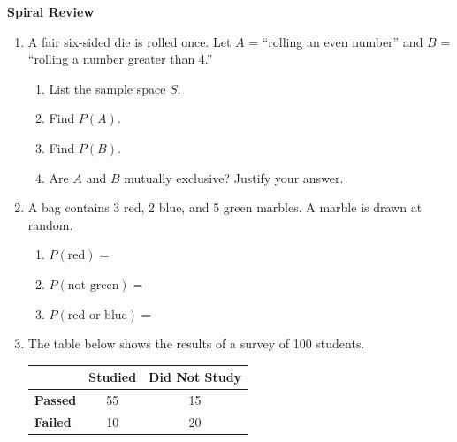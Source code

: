 \documentclass[10pt]{article}
\begin{document}
\namedateperiod

\vspace{0.2in}

{\large\bfseries\color{navy} Spiral Review}

\vspace{0.12in}

\begin{enumerate}

    \item A fair six-sided die is rolled once. Let $A$ = ``rolling an even number'' and
          $B$ = ``rolling a number greater than 4.''

    \begin{enumerate}[label=(\alph*), itemsep=8pt]
        \item List the sample space $S$. \quad {}
        \item Find $P(A)$. \quad {}
        \item Find $P(B)$. \quad {}
        \item Are $A$ and $B$ mutually exclusive? Justify your answer.\\
    \end{enumerate}

    \vspace{0.14in}

    \item A bag contains 3 red, 2 blue, and 5 green marbles. A marble is drawn at random.
    \begin{enumerate}[label=(\alph*), itemsep=8pt]
        \item $P(\text{red}) = $ 
        \item $P(\text{not green}) = $ 
        \item $P(\text{red or blue}) = $ 
    \end{enumerate}

    \vspace{0.14in}

    \item The table below shows the results of a survey of 100 students.

    \vspace{6pt}
    \renewcommand{\arraystretch}{1.5}
    \begin{tabular}{@{}lcc@{}}
    & \textbf{Studied} & \textbf{Did Not Study} \\
    \hline
    \textbf{Passed} & 55 & 15 \\
    \textbf{Failed}  & 10 & 20 \\
    \end{tabular}


\end{enumerate}
\end{document}
